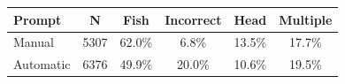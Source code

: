 \begin{table}[]
\centering
\begin{tabular}{ l c c c c c }
\hline
Prompt & N & Fish & Incorrect & Head & Multiple\\
\hline
Manual & 5307 & 62.0\% & 6.8\% & 13.5\% & 17.7\% \\
Automatic & 6376 & 49.9\% & 20.0\% & 10.6\% & 19.5\% \\
\hline
\end{tabular}
\end{table}
